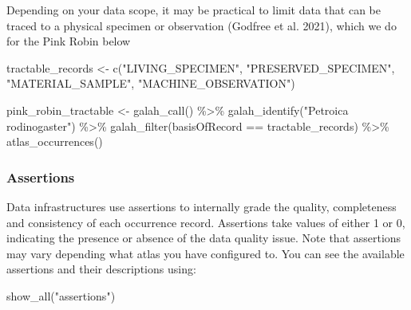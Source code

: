 \documentclass[
  letterpaper,
  DIV=11,
  numbers=noendperiod,
  oneside]{scrreprt}
\newenvironment{Shaded}{\begin{snugshade}}{\end{snugshade}}
\newcommand{\FunctionTok}[1]{\textcolor[rgb]{0.28,0.35,0.67}{#1}}
\newcommand{\NormalTok}[1]{\textcolor[rgb]{0.00,0.23,0.31}{#1}}
\newcommand{\OtherTok}[1]{\textcolor[rgb]{0.00,0.23,0.31}{#1}}
\newcommand{\SpecialCharTok}[1]{\textcolor[rgb]{0.37,0.37,0.37}{#1}}
\newcommand{\StringTok}[1]{\textcolor[rgb]{0.13,0.47,0.30}{#1}}
\begin{document}
Depending on your data scope, it may be practical to limit data that can
be traced to a physical specimen or observation (Godfree et al. 2021),
which we do for the Pink Robin below

\begin{Shaded}
\begin{Highlighting}[]
\NormalTok{tractable\_records }\OtherTok{\textless{}{-}} \FunctionTok{c}\NormalTok{(}\StringTok{"LIVING\_SPECIMEN"}\NormalTok{, }
                       \StringTok{"PRESERVED\_SPECIMEN"}\NormalTok{, }
                       \StringTok{"MATERIAL\_SAMPLE"}\NormalTok{, }
                       \StringTok{"MACHINE\_OBSERVATION"}\NormalTok{)}

\NormalTok{pink\_robin\_tractable }\OtherTok{\textless{}{-}} \FunctionTok{galah\_call}\NormalTok{() }\SpecialCharTok{\%\textgreater{}\%} 
  \FunctionTok{galah\_identify}\NormalTok{(}\StringTok{"Petroica rodinogaster"}\NormalTok{) }\SpecialCharTok{\%\textgreater{}\%} 
  \FunctionTok{galah\_filter}\NormalTok{(basisOfRecord }\SpecialCharTok{==}\NormalTok{ tractable\_records) }\SpecialCharTok{\%\textgreater{}\%} 
  \FunctionTok{atlas\_occurrences}\NormalTok{()}
\end{Highlighting}
\end{Shaded}

\hypertarget{assertions}{%
\subsubsection{Assertions}\label{assertions}}

Data infrastructures use assertions to internally grade the quality,
completeness and consistency of each occurrence record. Assertions take
values of either 1 or 0, indicating the presence or absence of the data
quality issue. Note that assertions may vary depending what atlas you
have configured to. You can see the available assertions and their
descriptions using:

\begin{Shaded}
\begin{Highlighting}[]
\FunctionTok{show\_all}\NormalTok{(}\StringTok{"assertions"}\NormalTok{) }
\end{Highlighting}
\end{Shaded}
\end{document}
